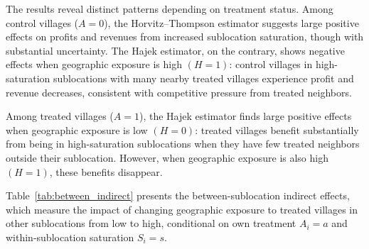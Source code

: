 \documentclass{article}
\begin{document}
The results reveal distinct patterns depending on treatment status. Among control villages ($A=0$), the Horvitz--Thompson estimator suggests large positive effects on profits and revenues from increased sublocation saturation, though with substantial uncertainty. The Hajek estimator, on the contrary, shows negative effects when geographic exposure is high $(H=1)$: control villages in high-saturation sublocations with many nearby treated villages experience profit and revenue decreases, consistent with competitive pressure from treated neighbors.

Among treated villages ($A=1$), the Hajek estimator finds large positive effects when geographic exposure is low $(H=0)$: treated villages benefit substantially from being in high-saturation sublocations when they have few treated neighbors outside their sublocation. However, when geographic exposure is also high $(H=1)$, these benefits disappear.

Table~\ref{tab:between_indirect} presents the between-sublocation indirect effects, which measure the impact of changing geographic exposure to treated villages in other sublocations from low to high, conditional on own treatment $A_i=a$ and within-sublocation saturation $S_i=s$.
\end{document}
